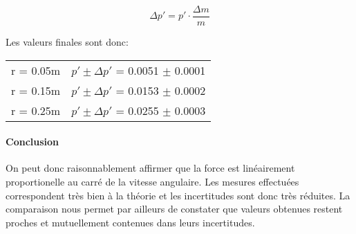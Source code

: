 \begin{equation}
    \Delta p' = p' \cdot \frac{\Delta m}{m}
\end{equation}

Les valeurs finales sont donc:

\begin{table}[ht]
    \centering
    \begin{tabular}{l l}
	r = 0.05m & $p'\pm \Delta p'$ = 0.0051 $\pm$ 0.0001\\
	r = 0.15m & $p'\pm \Delta p'$ = 0.0153 $\pm$ 0.0002\\
	r = 0.25m & $p'\pm \Delta p'$ = 0.0255 $\pm$ 0.0003\\
    \end{tabular}
\end{table}

\paragraph{Conclusion}

On peut donc raisonnablement affirmer que la force est linéairement proportionelle au carré de la vitesse angulaire.
Les mesures effectuées correspondent très bien à la théorie et les incertitudes sont donc très réduites. La comparaison nous permet par ailleurs de constater que valeurs obtenues restent proches et mutuellement contenues dans leurs incertitudes.
